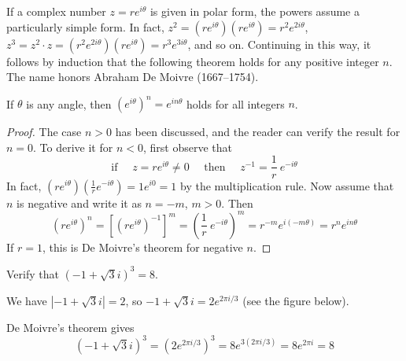 \documentclass{ximera}
\begin{document}
If a complex number $z = re^{i\theta}$ is given in polar form, the powers assume a particularly simple form. In fact, $z^{2} = (re^{i\theta})(re^{i\theta}) = r^{2}e^{2i\theta}$, $z^{3} = z^{2} \cdot z = (r^{2}e^{2i\theta})(re^{i\theta}) = r^{3}e^{3i\theta}$, and so on. Continuing in this way, it follows by induction that the following theorem holds for any positive integer $n$. The name honors Abraham De Moivre (1667--1754).


\begin{theorem}\label{th:034080}
If $\theta$ is any angle, then $(e^{i\theta})^{n} = e^{in\theta}$ holds for all integers $n$.
\end{theorem}

\begin{proof}
The case $n > 0$ has been discussed, and the reader can verify the result for $n = 0$. To derive it for $n < 0$, first observe that
\begin{equation*}
\mbox{if } \quad z = re^{i\theta}\neq 0 \quad \mbox{ then } \quad z^{-1} = \frac{1}{r}~e^{-i\theta}
\end{equation*}
In fact, $(re^{i\theta})(\frac{1}{r} e^{-i\theta}) = 1e^{i0} = 1$ by the multiplication rule. Now assume that $n$ is negative and write it as $n = -m$, $m > 0$. Then
\begin{equation*}
(re^{i\theta})^n = [(re^{i\theta})^{-1}]^m = (\frac{1}{r}~e^{-i\theta})^m = r^{-m} e^{i(-m\theta)}=r^ne^{in\theta}
\end{equation*}
If $r = 1$, this is De Moivre's theorem for negative $n$.
\end{proof}

\begin{example}\label{ex:034096}
Verify that $(-1+\sqrt{3}i)^3 = 8$.

\begin{explanation}
  We have $| -1 + \sqrt{3}i| =2$, so $-1 + \sqrt{3}i = 2e^{2\pi i /3}$ (see the figure below). 
  
\begin{center}
\end{center}  
  
  
  
De Moivre's theorem gives
\begin{equation*}
(-1+\sqrt{3}i)^3 = (2e^{2\pi i /3})^3 = 8e^{3(2\pi i /3)} = 8e^{2\pi i} = 8
\end{equation*}
\end{explanation}
\end{example}
\end{document}

